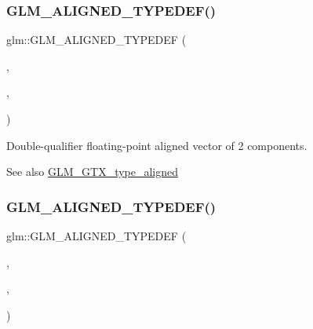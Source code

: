\subsubsection{\texorpdfstring{G\+L\+M\+\_\+\+A\+L\+I\+G\+N\+E\+D\+\_\+\+T\+Y\+P\+E\+D\+E\+F()}{GLM\_ALIGNED\_TYPEDEF()}\hspace{0.1cm}{\footnotesize\ttfamily [160/209]}}
{\footnotesize\ttfamily glm\+::\+G\+L\+M\+\_\+\+A\+L\+I\+G\+N\+E\+D\+\_\+\+T\+Y\+P\+E\+D\+EF (\begin{DoxyParamCaption}\item[{\hyperlink{group__gtc__type__precision_ga6c794781267fd5c810d9a6e7086e02a6}{f64vec2}}]{,  }\item[{aligned\+\_\+f64vec2}]{,  }\item[{16}]{ }\end{DoxyParamCaption})}

Double-\/qualifier floating-\/point aligned vector of 2 components. \begin{DoxySeeAlso}{See also}
\hyperlink{group__gtx__type__aligned}{G\+L\+M\+\_\+\+G\+T\+X\+\_\+type\+\_\+aligned} 
\end{DoxySeeAlso}
\mbox{\label{group__gtx__type__aligned_gaf3d3bbc1e93909b689123b085e177a14}} 
\subsubsection{\texorpdfstring{G\+L\+M\+\_\+\+A\+L\+I\+G\+N\+E\+D\+\_\+\+T\+Y\+P\+E\+D\+E\+F()}{GLM\_ALIGNED\_TYPEDEF()}\hspace{0.1cm}{\footnotesize\ttfamily [161/209]}}
{\footnotesize\ttfamily glm\+::\+G\+L\+M\+\_\+\+A\+L\+I\+G\+N\+E\+D\+\_\+\+T\+Y\+P\+E\+D\+EF (\begin{DoxyParamCaption}\item[{\hyperlink{group__gtc__type__precision_ga659b65d8792f93da76c2da44f06e0b8b}{f64vec3}}]{,  }\item[{aligned\+\_\+f64vec3}]{,  }\item[{32}]{ }\end{DoxyParamCaption})}

